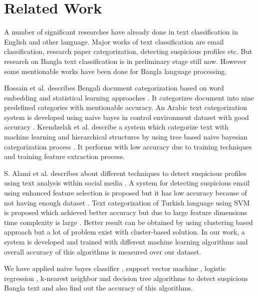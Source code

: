 \section{\textbf{Related Work}}
A number of significant researches have already done in text classification in English and other language. Major works of text classification are email classification, research paper categorization, detecting suspicious profiles etc.
But research on Bangla text classification is in preliminary stage still now. However some mentionable works have been done for Bangla language processing.
\vspace{0.1cm}

Hossain et al. describes Bengali document categorization based on word embedding and statistical learning approaches \cite{hossain2018automatic}. It categorizes document into nine predefined categories with mentionable accuracy. An Arabic text categorization system is developed using naive bayes in control environment dataset with good accuracy \cite{alsaleem2011automated}.
Krendzelak et al. describe a system which categorize text with machine learning and hierarchical structures by using tree based naive bayesian categorization process \cite{krendzelak2015text, chy2014bangla}. It performs with low accuracy due to training techniques and training feature extraction process.
\vspace{0.1cm}

S. Alami et al. describes about different techniques to detect suspicious profiles using text analysis within social media \cite{alami2015detecting}. A system for detecting suspicious email using enhanced feature selection is proposed but it has low accuracy because of not having enough dataset \cite{nizamani2013modeling}. Text categorization of Turkish language using SVM is proposed which achieved better accuracy but due to large feature dimensions time complexity is large \cite{kaya2012sentiment}. Better result can be obtained by using clustering based approach \cite{ismail2014bangla, ahmad2016bengali} but a lot of problem exist with cluster-based solution. In our work, a system is developed and trained with different machine learning algorithms and overall accuracy of this algorithms is measured over our dataset.\par
We have applied naive bayes classifier \cite{yoo2015classification}, support vector machine \cite{wei2012text,villmann2017can}, logistic regression \cite{sharma2015active}, k-nearest neighbor \cite{harisinghaney2014text} and decision tree \cite{chavan2014survey} algorithms to detect suspicious Bangla text and also find out the accuracy of this algorithms.